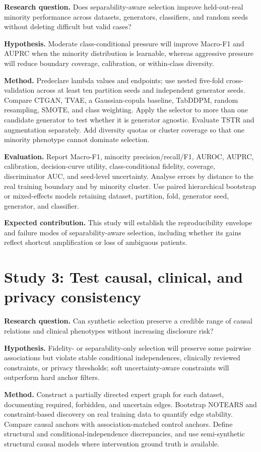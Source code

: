 \textbf{Research question.} Does separability-aware selection improve held-out-real minority performance across datasets, generators, classifiers, and random seeds without deleting difficult but valid cases?

\textbf{Hypothesis.} Moderate class-conditional pressure will improve Macro-F1 and AUPRC when the minority distribution is learnable, whereas aggressive pressure will reduce boundary coverage, calibration, or within-class diversity.

\textbf{Method.} Predeclare lambda values and endpoints; use nested five-fold cross-validation across at least ten partition seeds and independent generator seeds. Compare CTGAN, TVAE, a Gaussian-copula baseline, TabDDPM, random resampling, SMOTE, and class weighting. Apply the selector to more than one candidate generator to test whether it is generator agnostic. Evaluate TSTR and augmentation separately. Add diversity quotas or cluster coverage so that one minority phenotype cannot dominate selection.

\textbf{Evaluation.} Report Macro-F1, minority precision/recall/F1, AUROC, AUPRC, calibration, decision-curve utility, class-conditional fidelity, coverage, discriminator AUC, and seed-level uncertainty. Analyse errors by distance to the real training boundary and by minority cluster. Use paired hierarchical bootstrap or mixed-effects models retaining dataset, partition, fold, generator seed, generator, and classifier.

\textbf{Expected contribution.} This study will establish the reproducibility envelope and failure modes of separability-aware selection, including whether its gains reflect shortcut amplification or loss of ambiguous patients.

\section{Study 3: Test causal, clinical, and privacy consistency}

\textbf{Research question.} Can synthetic selection preserve a credible range of causal relations and clinical phenotypes without increasing disclosure risk?

\textbf{Hypothesis.} Fidelity- or separability-only selection will preserve some pairwise associations but violate stable conditional independences, clinically reviewed constraints, or privacy thresholds; soft uncertainty-aware constraints will outperform hard anchor filters.

\textbf{Method.} Construct a partially directed expert graph for each dataset, documenting required, forbidden, and uncertain edges. Bootstrap NOTEARS and constraint-based discovery on real training data to quantify edge stability. Compare causal anchors with association-matched control anchors. Define structural and conditional-independence discrepancies, and use semi-synthetic structural causal models where intervention ground truth is available.

